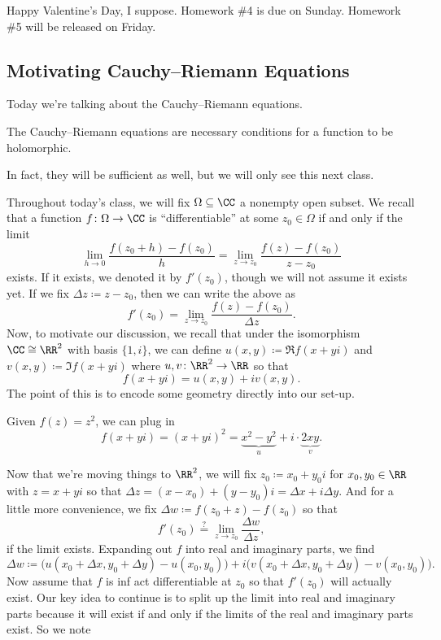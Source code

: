 
Happy Valentine's Day, I suppose. Homework \#4 is due on Sunday. Homework \#5 will be released on Friday.

\subsection{Motivating Cauchy--Riemann Equations}
Today we're talking about the Cauchy--Riemann equations.
\begin{idea}
	The Cauchy--Riemann equations are necessary conditions for a function to be holomorphic.
\end{idea}
In fact, they will be sufficient as well, but we will only see this next class.

Throughout today's class, we will fix $\Omega\subseteq\CC$ a nonempty open subset. We recall that a function $f\colon \Omega\to\CC$ is ``differentiable'' at some $z_0\in\Omega$ if and only if the limit
\[\lim_{h\to0}\frac{f(z_0+h)-f(z_0)}{h}=\lim_{z\to z_0}\frac{f(z)-f(z_0)}{z-z_0}\]
exists. If it exists, we denoted it by $f'(z_0)$, though we will not assume it exists yet. If we fix $\Delta z\coloneqq z-z_0$, then we can write the above as
\[f'(z_0)=\lim_{z\to z_0}\frac{f(z)-f(z_0)}{\Delta z}.\]
Now, to motivate our discussion, we recall that under the isomorphism $\CC\cong\RR^2$ with basis $\{1,i\}$, we can define $u(x,y)\coloneqq \Re f(x+yi)$ and $v(x,y)\coloneqq \Im f(x+yi)$ where $u,v\colon \RR^2\to\RR$ so that
\[f(x+yi)=u(x,y)+iv(x,y).\]
The point of this is to encode some geometry directly into our set-up.
\begin{example}
	Given $f(z)=z^2$, we can plug in
	\[f(x+yi)=(x+yi)^2=\underbrace{x^2-y^2}_u+i\cdot\underbrace{2xy}_v.\]
\end{example}
Now that we're moving things to $\RR^2$, we will fix $z_0\coloneqq x_0+y_0i$ for $x_0,y_0\in\RR$ with $z=x+yi$ so that $\Delta z=(x-x_0)+(y-y_0)i=\Delta x+i\Delta y$. And for a little more convenience, we fix $\Delta w\coloneqq f(z_0+z)-f(z_0)$ so that
\[f'(z_0)\stackrel?=\lim_{z\to z_0}\frac{\Delta w}{\Delta z},\]
if the limit exists. Expanding out $f$ into real and imaginary parts, we find
\[\Delta w \coloneqq  \big(u(x_0+\Delta x,y_0+\Delta y)-u(x_0,y_0)\big) + i\big(v(x_0+\Delta x,y_0+\Delta y)-v(x_0,y_0)\big).\]
Now assume that $f$ is inf act differentiable at $z_0$ so that $f'(z_0)$ will actually exist. Our key idea to continue is to split up the limit into real and imaginary parts because it will exist if and only if the limits of the real and imaginary parts exist. So we note
